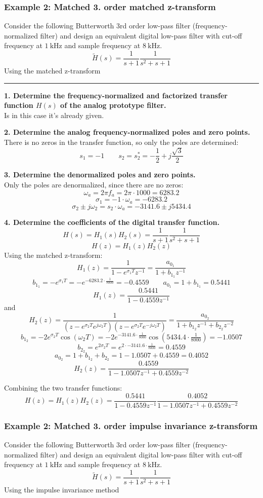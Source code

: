\subsubsection{Example 2: Matched 3. order matched z-transform}
Consider the following Butterworth 3rd order low-pass filter (frequency-normalized filter) 
and design an equivalent digital low-pass filter with cut-off frequency at $\SI{1}{\kilo\hertz}$ and sample frequency at $\SI{8}{\kilo\hertz}$. 
$${\tilde{H}}(s)=\frac{1}{s+1}\frac{1}{s^{2}+s+1}$$
Using the matched z-transform

\rule{\textwidth}{0.5pt}

\textbf{1. Determine the frequency-normalized and factorized transfer function $H(s)$ of the analog prototype filter.}\\
Is in this case it's already given.

\textbf{2. Determine the analog frequency-normalized poles and zero points.}\\
There is no zeros in the transfer function, so only the poles are determined:
$$s_1=-1 \qquad s_2=s_2^*=-\frac{1}{2}+j\frac{\sqrt{3}}{2}$$

\textbf{3. Determine the denormalized poles and zero points.}\\
Only the poles are denormalized, since there are no zeros:
$$\omega_a=2\pi f_a=2\pi\cdot 1000=6283.2$$
$$\sigma_1=-1\cdot\omega_a=-6283.2$$
$$\sigma_2\pm j\omega_2=s_2\cdot\omega_a=-3141.6\pm j5434.4$$

\textbf{4. Determine the coefficients of the digital transfer function.}
$$H(s)=H_1(s)H_2(s)=\frac{1}{s+1}\frac{1}{s^{2}+s+1}$$
$$H(z)=H_1(z)H_2(z)$$
Using the matched z-transform:
$$H_1(z)=\frac{1}{1-e^{\sigma_1 T}z^{-1}}=\frac{a_{0_1}}{1+b_{1_1}z^{-1}}$$
$$b_{1_1}=-e^{\sigma_1 T}=-e^{-6283.2\cdot\frac{1}{8000}}=-0.4559\qquad a_{0_1}=1+b_{1_1}=0.5441$$
$$H_1(z)=\frac{0.5441}{1-0.4559z^{-1}}$$
and
$$H_2(z)={\frac{1}{(z-e^{\sigma_{2}T}e^{j\omega_{2}T})(z-e^{\sigma_{2}T}e^{-j\omega_{2}T})}}=\frac{a_{0_2}}{1+b_{1_2}z^{-1}+b_{2_2}z^{-2}}$$
$$b_{1_2}=-2e^{\sigma_2 T}\cos(\omega_2 T)=-2e^{-3141.6\cdot\frac{1}{8000}}\cos(5434.4\cdot\tfrac{1}{8000})=-1.0507$$
$$b_{2_2}=e^{2\sigma_2 T}=e^{2\cdot -3141.6\cdot\frac{1}{8000}}=0.4559$$
$$a_{0_2}=1+b_{1_2}+b_{2_2}=1-1.0507+0.4559=0.4052$$
$$H_2(z)=\frac{0.4559}{1-1.0507z^{-1}+0.4559z^{-2}}$$

Combining the two transfer functions:
$$H(z)=H_1(z)H_2(z)=\frac{0.5441}{1-0.4559z^{-1}}\frac{0.4052}{1-1.0507z^{-1}+0.4559z^{-2}}$$

\subsubsection{Example 2: Matched 3. order impulse invariance z-transform}
Consider the following Butterworth 3rd order low-pass filter (frequency-normalized filter) 
and design an equivalent digital low-pass filter with cut-off frequency at $\SI{1}{\kilo\hertz}$ and sample frequency at $\SI{8}{\kilo\hertz}$. 
$${\tilde{H}}(s)=\frac{1}{s+1}\frac{1}{s^{2}+s+1}$$
Using the impulse invariance method

